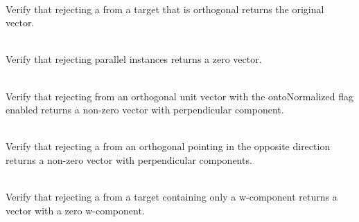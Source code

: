 \begin{DoxyRefList}
\item[{\parbox[t]{\linewidth}{Member \doxylink{_projection_tests_8cpp_adf87939b01d28a0b7aa3bbef247225bc}{Vector4\+DRejection\+\_\+\+Orthogonal\+Rejection\+Returns\+Original\+Vector} ()}}]\hfill \\
\label{test__test000140}%
%
Verify that rejecting a  from a target  that is orthogonal returns the original vector.  
\item[{\parbox[t]{\linewidth}{Member \doxylink{_projection_tests_8cpp_a4842b0d1ce3435849da34afd6375e0e9}{Vector4\+DRejection\+\_\+\+Parallel\+Vectors\+Returns\+Zero\+Vector} ()}}]\hfill \\
\label{test__test000135}%
%
Verify that rejecting parallel  instances returns a zero vector.  
\item[{\parbox[t]{\linewidth}{Member \doxylink{_projection_tests_8cpp_af41c26cc329f5a4e934f407275771429}{Vector4\+DRejection\+\_\+\+Rejection\+From\+Normalized\+Vector\+Returns\+Non\+Zero\+Vector} ()}}]\hfill \\
\label{test__test000143}%
%
Verify that rejecting from an orthogonal unit vector with the {\ttfamily onto\+Normalized} flag enabled returns a non-\/zero vector with perpendicular component.  
\item[{\parbox[t]{\linewidth}{Member \doxylink{_projection_tests_8cpp_a1b2ce28c5c44c5f2c9bec888801fa1b9}{Vector4\+DRejection\+\_\+\+Rejection\+From\+Vector\+In\+Opposite\+Direction\+Returns\+Vector\+With\+Perpendicular\+Components} ()}}]\hfill \\
\label{test__test000144}%
%
Verify that rejecting a  from an orthogonal  pointing in the opposite direction returns a non-\/zero vector with perpendicular components.  
\item[{\parbox[t]{\linewidth}{Member \doxylink{_projection_tests_8cpp_ac9e910fa773693082dbc0ebe8845e80f}{Vector4\+DRejection\+\_\+\+Rejection\+From\+WAxis\+Returns\+Vector\+With\+Zero\+WComponent} ()}}]\hfill \\
\label{test__test000139}%
%
Verify that rejecting a  from a target  containing only a w-\/component returns a vector with a zero w-\/component.  

\end{DoxyRefList}
